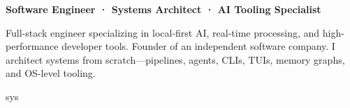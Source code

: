 \documentclass{nfcv}
\begin{document}
\begin{minipage}[b]{0.6\linewidth}
\begin{cvbanner}[6.1pt]
\end{cvbanner}
\vspace{5pt}
\par {\bfseries Software Engineer · Systems Architect · AI Tooling Specialist}\par\vspace{3pt}
{\serif\small\raggedright\color{nf-muted} Full-stack engineer specializing in local-first AI, real-time processing, and high-performance developer tools. Founder of an independent software company. I architect systems from scratch—pipelines, agents, CLIs, TUIs, memory graphs, and OS-level tooling.\par}
\end{minipage}\hfill
\begin{minipage}[b]{0.34\linewidth}
\begin{pane}[fetch]{sys}
\begin{cvfetch}[5.4em]
\end{cvfetch}
\end{pane}
\end{minipage}
\end{document}

